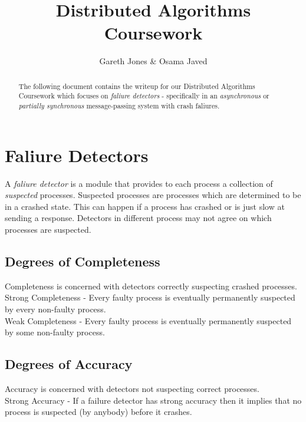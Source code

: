 \documentclass{article}
\begin{document}
\title{Distributed Algorithms Coursework}
\author{Gareth Jones \& Osama Javed}

\maketitle

\begin{abstract}
The following document contains the writeup for our Distributed Algorithms Coursework which focuses on {\em faliure detectors} - specifically in an {\em asynchronous} or {\em partially synchronous} message-passing system with crash faliures.
\end{abstract}

\newpage

\section{Faliure Detectors}

A {\em faliure detector} is a module that provides to each process a collection of {\em suspected} processes.  Suspected processes are processes which are determined to be in a crashed state.  This can happen if a process has crashed or is just slow at sending a response.  Detectors in different process may not agree on which processes are suspected.

\subsection{Degrees of Completeness}

Completeness is concerned with detectors correctly suspecting crashed processes.\\

\noindent
Strong Completeness - Every faulty process is eventually permanently suspected by every non-faulty process.\\

\noindent
Weak Completeness - Every faulty process is eventually permanently suspected by some non-faulty process.

\subsection{Degrees of Accuracy}

Accuracy is concerned with detectors not suspecting correct processes.\\

\noindent
Strong Accuracy - If a failure detector has strong accuracy then it implies that no process is suspected (by anybody) before it crashes.\\
\end{document}

